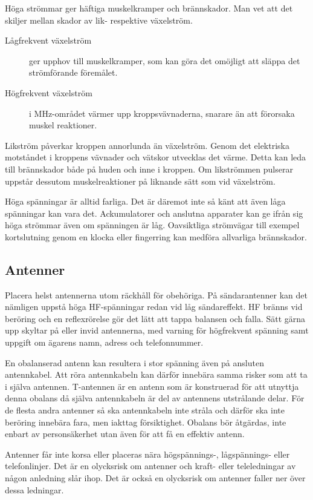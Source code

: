 Höga strömmar ger häftiga muskelkramper och brännskador.
Man vet att det skiljer mellan skador av lik- respektive växelström.

\begin{description}
\item[Lågfrekvent växelström] ger upphov till muskelkramper, som kan göra det
omöjligt att släppa det strömförande föremålet.

\item[Högfrekvent växelström] i MHz-området värmer upp kroppsvävnaderna,
snarare än att förorsaka muskel reaktioner.
\end{description}

Likström påverkar kroppen annorlunda än växelström.
Genom det elektriska motståndet i kroppens vävnader och vätskor utvecklas det
värme.
Detta kan leda till brännskador både på huden och inne i kroppen.
Om likströmmen pulserar uppstår dessutom muskelreaktioner på liknande sätt som
vid växelström.

Höga spänningar är alltid farliga.
Det är däremot inte så känt att även låga spänningar kan vara det.
Ackumulatorer och anslutna apparater kan ge ifrån sig höga strömmar även om
spänningen är låg.
Oavsiktliga strömvägar till exempel kortslutning genom en klocka eller
fingerring kan medföra allvarliga brännskador.

\subsection{Antenner}

Placera helst antennerna utom räckhåll för obehöriga.
På sändarantenner kan det nämligen uppstå höga HF-spänningar redan vid
låg sändareffekt.
HF bränns vid beröring och en reflexrörelse gör det lätt att tappa balansen och
falla.
Sätt gärna upp skyltar på eller invid antennerna, med varning för högfrekvent
spänning samt uppgift om ägarens namn, adress och telefonnummer.

En obalanserad antenn kan resultera i stor spänning även på ansluten
antennkabel.
Att röra antennkabeln kan därför innebära samma risker som att ta i själva
antennen.
T-antennen är en antenn som är konstruerad för att utnyttja denna obalans då
själva antennkabeln är del av antennens utstrålande delar.
För de flesta andra antenner så ska antennkabeln inte stråla och därför ska inte
beröring innebära fara, men iakttag försiktighet.
Obalans bör åtgärdas, inte enbart av personsäkerhet utan även för att få en
effektiv antenn.

Antenner får inte korsa eller placeras nära hög\-spännings-, låg\-spännings- eller
telefonlinjer.
Det är en olycksrisk om antenner och kraft- eller teleledningar av någon
anledning slår ihop.
Det är också en olycksrisk om antenner faller ner över dessa ledningar.

